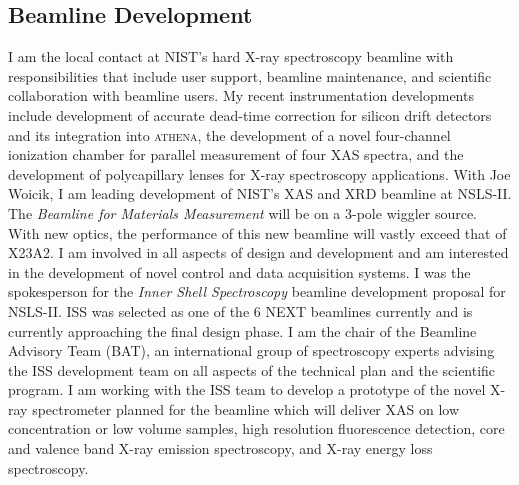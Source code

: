 \documentclass[11pt]{moderncv}
\begin{document}
\subsection{Beamline Development}
%
{I am the local contact at NIST's hard X-ray spectroscopy beamline
  with responsibilities that include user support, beamline
  maintenance, and scientific collaboration with beamline users.  My
  recent instrumentation developments include development of
  accurate dead-time correction for silicon drift detectors and its
  integration into \textsc{athena}, the development of a novel
  four-channel ionization chamber for parallel measurement of four XAS
  spectra, and the development of polycapillary lenses for X-ray
  spectroscopy applications.}
%
%
{With Joe Woicik, I am leading development of NIST's XAS and XRD
  beamline at NSLS-II.  The \textit{Beamline for Materials
    Measurement} will be on a 3-pole wiggler source.  With new optics,
  the performance of this new beamline will vastly exceed that of
  X23A2.  I am involved in all aspects of design and development and
  am interested in the development of novel control and data
  acquisition systems.}
%
%
{I was the spokesperson for the \textit{Inner Shell Spectroscopy}
  beamline development proposal for NSLS-II.  ISS was selected as one
  of the 6 NEXT beamlines currently and is currently approaching the
  final design phase.  I am the chair of the Beamline Advisory Team
  (BAT), an international group of spectroscopy experts advising the
  ISS development team on all aspects of the technical plan and the
  scientific program.  I am working with the ISS team to develop a
  prototype of the novel X-ray spectrometer planned for the beamline
  which will deliver XAS on low concentration or low volume samples,
  high resolution fluorescence detection, core and valence band X-ray
  emission spectroscopy, and X-ray energy loss spectroscopy.}


\newpage
\end{document}

